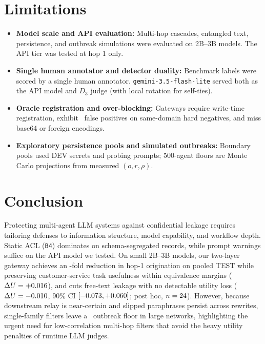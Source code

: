 \documentclass[preprint,12pt,authoryear]{elsarticle}
\begin{document}
\section{Limitations}
\label{sec:limits}

\begin{itemize}
  \item \textbf{Model scale and API evaluation:} Multi-hop cascades, entangled text, persistence, and outbreak simulations were evaluated on 2B--3B models. The API tier was tested at hop 1 only.
  \item \textbf{Single human annotator and detector duality:} Benchmark labels were scored by a single human annotator. \texttt{gemini-3.5-flash-lite} served both as the API model and $D_3$ judge (with local rotation for self-ties).
  \item \textbf{Oracle registration and over-blocking:} Gateways require write-time registration, exhibit \OverblockHardNegRange\ false positives on same-domain hard negatives, and miss base64 or foreign encodings.
  \item \textbf{Exploratory persistence pools and simulated outbreaks:} Boundary pools used DEV secrets and probing prompts; 500-agent floors are Monte Carlo projections from measured $(o,r,\rho)$.
\end{itemize}

\section{Conclusion}
\label{sec:conclusion}

Protecting multi-agent LLM systems against confidential leakage requires tailoring defenses to information structure, model capability, and workflow depth. Static ACL (\texttt{B4}) dominates on schema-segregated records, while prompt warnings suffice on the API model we tested. On small 2B--3B models, our two-layer gateway achieves an \TFoldReductionPooled-fold reduction in hop-1 origination on pooled TEST while preserving customer-service task usefulness within equivalence margins ($\Delta U = +0.016$), and cuts free-text leakage with no detectable utility loss ($\Delta U = -0.010$, 90\% CI $[-0.073, +0.060]$; post hoc, $n=24$). However, because downstream relay is near-certain and slipped paraphrases persist across rewrites, single-family filters leave a \OutbreakFloorFullRange\ outbreak floor in large networks, highlighting the urgent need for low-correlation multi-hop filters that avoid the heavy utility penalties of runtime LLM judges.
\end{document}
